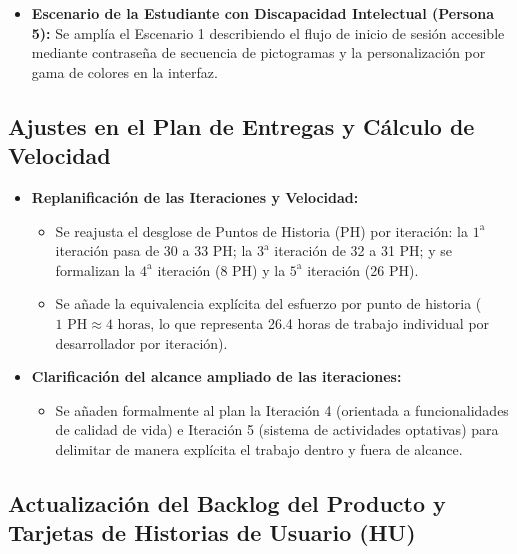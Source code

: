 \begin{itemize}
\begin{itemize}
    \item \textbf{Escenario de la Estudiante con Discapacidad Intelectual (Persona 5):} Se amplía el Escenario 1 describiendo el flujo de inicio de sesión accesible mediante contraseña de secuencia de pictogramas y la personalización por gama de colores en la interfaz.
\end{itemize}
\end{itemize}\subsection{Ajustes en el Plan de Entregas y Cálculo de Velocidad}
\begin{itemize}
\item \textbf{Replanificación de las Iteraciones y Velocidad:}
\begin{itemize}
\item Se reajusta el desglose de Puntos de Historia (PH) por iteración: la $1^{\text{a}}$ iteración pasa de 30 a 33 PH; la $3^{\text{a}}$ iteración de 32 a 31 PH; y se formalizan la $4^{\text{a}}$ iteración (8 PH) y la $5^{\text{a}}$ iteración (26 PH).
\item Se añade la equivalencia explícita del esfuerzo por punto de historia ($1 \text{ PH} \approx 4 \text{ horas}$, lo que representa 26.4 horas de trabajo individual por desarrollador por iteración).
\end{itemize}\item \textbf{Clarificación del alcance ampliado de las iteraciones:}
\begin{itemize}
    \item Se añaden formalmente al plan la Iteración 4 (orientada a funcionalidades de calidad de vida) e Iteración 5 (sistema de actividades optativas) para delimitar de manera explícita el trabajo dentro y fuera de alcance.
\end{itemize}
\end{itemize}\subsection{Actualización del Backlog del Producto y Tarjetas de Historias de Usuario (HU)}
